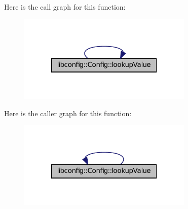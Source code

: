 Here is the call graph for this function:
\nopagebreak
\begin{figure}[H]
\begin{center}
\leavevmode
\includegraphics[width=236pt]{classlibconfig_1_1_config_a5087522213b6c2b2b658c6d1fdbe21dd_cgraph}
\end{center}
\end{figure}




Here is the caller graph for this function:
\nopagebreak
\begin{figure}[H]
\begin{center}
\leavevmode
\includegraphics[width=236pt]{classlibconfig_1_1_config_a5087522213b6c2b2b658c6d1fdbe21dd_icgraph}
\end{center}
\end{figure}


